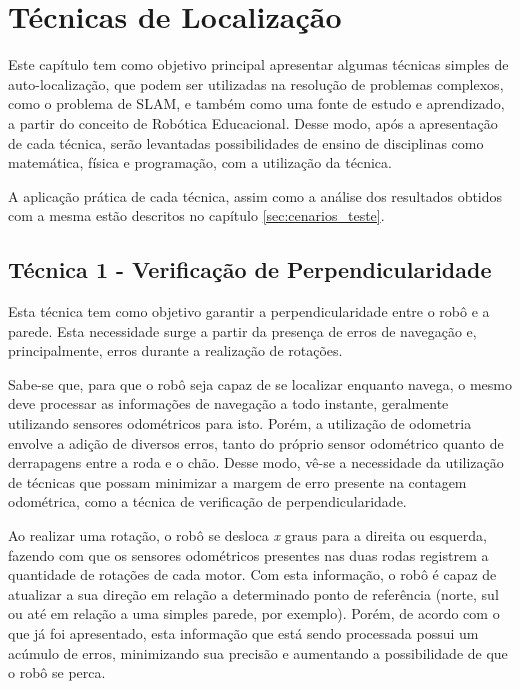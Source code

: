 \chapter[Técnicas de Localização]{Técnicas de Localização}
\label{sec:tecnicas_localizacao}

Este capítulo tem como objetivo principal apresentar algumas técnicas simples de auto-localização, que podem ser utilizadas na resolução de problemas complexos, como o problema de SLAM, e também como uma fonte de estudo e aprendizado, a partir do conceito de Robótica Educacional. Desse modo, após a apresentação de cada técnica, serão levantadas possibilidades de ensino de disciplinas como matemática, física e programação, com a utilização da técnica.

A aplicação prática de cada técnica, assim como a análise dos resultados obtidos com a mesma estão descritos no capítulo \ref{sec:cenarios_teste}. 

\section{Técnica 1 - Verificação de Perpendicularidade} %
\label{sec:tecnica1}

	Esta técnica tem como objetivo garantir a perpendicularidade entre o robô e a parede. Esta necessidade surge a partir da presença de erros de navegação e, principalmente, erros durante a realização de rotações.

	Sabe-se que, para que o robô seja capaz de se localizar enquanto navega, o mesmo deve processar as informações de navegação a todo instante, geralmente utilizando sensores odométricos para isto. Porém, a utilização de odometria envolve a adição de diversos erros, tanto do próprio sensor odométrico quanto de derrapagens entre a roda e o chão. Desse modo, vê-se a necessidade da utilização de técnicas que possam minimizar a margem de erro presente na contagem odométrica, como a técnica de verificação de perpendicularidade.

	Ao realizar uma rotação, o robô se desloca \textit{x} graus para a direita ou esquerda, fazendo com que os sensores odométricos presentes nas duas rodas registrem a quantidade de rotações de cada motor. Com esta informação, o robô é capaz de atualizar a sua direção em relação a determinado ponto de referência (norte, sul ou até em relação a uma simples parede, por exemplo). Porém, de acordo com o que já foi apresentado, esta informação que está sendo processada possui um acúmulo de erros, minimizando sua precisão e aumentando a possibilidade de que o robô se perca.

